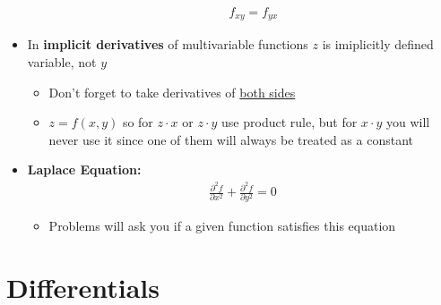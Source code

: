 \documentclass{article}
\begin{document}
\begin{itemize}
\begin{itemize}
    \begin{align}
      f_{xy} = f_{yx}
    \end{align}
  \end{itemize}
  \item In \textbf{implicit derivatives} of multivariable functions $z$ is imiplicitly defined variable, not $y$
  \begin{itemize}
    \item Don't forget to take derivatives of \underline{both sides}
    \item $z = f(x,y)$ so for $z\cdot x$ or $z\cdot y$ use product rule, but for $x\cdot y$ you will never use it since one of them will always be treated as a constant
  \end{itemize}
  \item \textbf{Laplace Equation:}
  \begin{align}
    \frac{\partial^2 f}{\partial x^2} + \frac{\partial^2 f}{\partial y^2} = 0
  \end{align}
  \begin{itemize}
    \item Problems will ask you if a given function satisfies this equation
  \end{itemize}
\end{itemize}


\section{Differentials}
\end{document}
